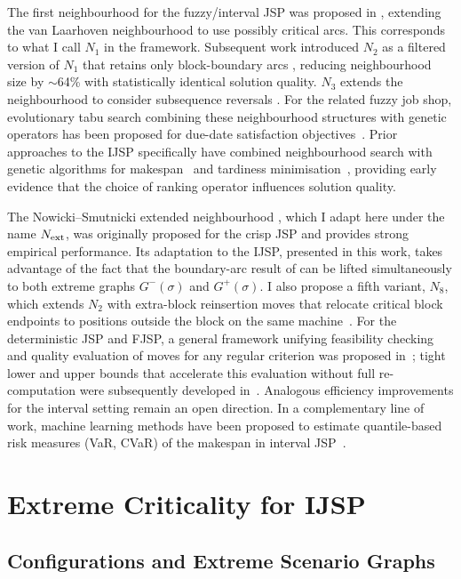 \documentclass[preprint,12pt]{elsarticle}
\begin{document}
The first neighbourhood for the fuzzy/interval JSP was proposed in \cite{GonzalezRodriguez2008}, extending the van Laarhoven neighbourhood \cite{vanLaarhoven1992} to use possibly critical arcs. This corresponds to what I call $N_1$ in the framework. Subsequent work introduced $N_2$ as a filtered version of $N_1$ that retains only block-boundary arcs \cite{N2fjsp}, reducing neighbourhood size by $\sim$64\% with statistically identical solution quality. $N_3$ extends the neighbourhood to consider subsequence reversals \cite{N3fjsp}. For the related fuzzy job shop, evolutionary tabu search combining these neighbourhood structures with genetic operators has been proposed for due-date satisfaction objectives~\cite{Vela2020}. Prior approaches to the IJSP specifically have combined neighbourhood search with genetic algorithms for makespan~\cite{DiazIPMU2020} and tardiness minimisation~\cite{DiazHAIS2020}, providing early evidence that the choice of ranking operator influences solution quality.

The Nowicki--Smutnicki extended neighbourhood \cite{Nowicki2005}, which I adapt here under the name $N_{\rm ext}$, was originally proposed for the crisp JSP and provides strong empirical performance. Its adaptation to the IJSP, presented in this work, takes advantage of the fact that the boundary-arc result of \cite{Nowicki1996} can be lifted simultaneously to both extreme graphs $G^-(\sigma)$ and $G^+(\sigma)$. I also propose a fifth variant, $N_8$, which extends $N_2$ with extra-block reinsertion moves that relocate critical block endpoints to positions outside the block on the same machine~\cite{Xie2022}. For the deterministic JSP and FJSP, a general framework unifying feasibility checking and quality evaluation of moves for any regular criterion was proposed in~\cite{Tamssaouet2023}; tight lower and upper bounds that accelerate this evaluation without full re-computation were subsequently developed in~\cite{GarciaGomez2026}. Analogous efficiency improvements for the interval setting remain an open direction. In a complementary line of work, machine learning methods have been proposed to estimate quantile-based risk measures (VaR, CVaR) of the makespan in interval JSP~\cite{Calamita2025}.


\section{Extreme Criticality for IJSP}
\label{sec3}

\subsection{Configurations and Extreme Scenario Graphs}
\label{sec3.1}
\end{document}
